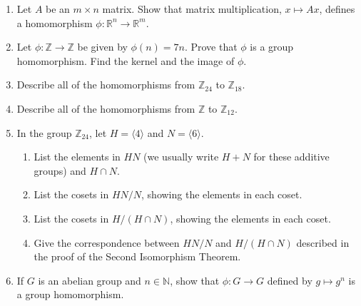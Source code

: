 {\begin{enumerate}
\begin{enumerate}
 \item
$\phi : {\mathbb M}_2( {\mathbb R})   \rightarrow {\mathbb R}$ defined by
\[
\phi
\left(
\begin{pmatrix}
a & b \\
c & d
\end{pmatrix}
\right)
= b,
\]
where ${\mathbb M}_2( {\mathbb R})$ is the additive group of $2 \times 2$ matrices with entries in ${\mathbb R}$.
 
\end{enumerate}
 
  
 
\item
Let $A$ be an $m \times n$ matrix.  Show that matrix multiplication,
$x \mapsto Ax$, defines a homomorphism $\phi : {\mathbb R}^n \rightarrow
{\mathbb R}^m$. 
 
 
\item
Let $\phi : {\mathbb Z} \rightarrow {\mathbb Z}$ be given by $\phi(n) = 7n$.
Prove that $\phi$ is a group homomorphism. Find the kernel and the
image of $\phi$.
 
 
\item
Describe all of the homomorphisms from ${\mathbb Z}_{24}$ to ${\mathbb Z}_{18}$. 
 
 
\item
Describe all of the homomorphisms from ${\mathbb Z}$ to ${\mathbb Z}_{12}$. 
 
 
\item
In the group ${\mathbb Z}_{24}$, let $H = \langle 4 \rangle$ and $N =
\langle 6 \rangle$. 
\begin{enumerate}
 
 \item
List the elements in $HN$ (we usually write $H + N$ for these additive
groups) and $H \cap N$. 
 
 \item
List the cosets in $HN/N$, showing the elements in each coset.
 
 \item
List the cosets in $H/(H \cap N)$, showing the elements in each coset. 
 
 \item
Give the correspondence between $HN/N$ and $H/(H \cap N)$ described in
the proof of the Second Isomorphism Theorem. 
 
\end{enumerate}
 
 
 
 
\item
If $G$ is an abelian group and $n \in {\mathbb N}$, show that $\phi : G
\rightarrow G$  defined by $g \mapsto g^n$ is a group homomorphism. 
 

\end{enumerate}}

